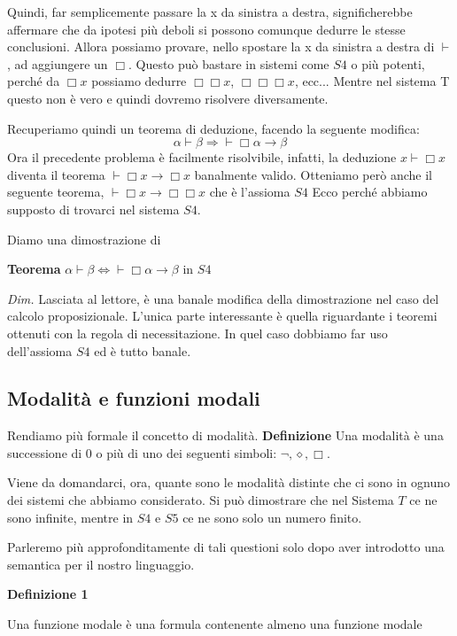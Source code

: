\documentclass[a4paper, 12pt]{article}
\begin{document}
Quindi, far semplicemente passare la x da sinistra a destra, significherebbe affermare che
da ipotesi più deboli si possono comunque dedurre le stesse conclusioni. Allora possiamo provare,
nello spostare la x da sinistra a destra di $\vdash$, ad aggiungere un $\Box$.
Questo può bastare in sistemi come $S4$ o più potenti, perché da $\Box x$ possiamo dedurre
$\Box \Box x$, $\Box \Box \Box x$, ecc...
Mentre nel sistema T questo non è vero e quindi dovremo risolvere diversamente.

Recuperiamo quindi un teorema di deduzione, facendo la seguente modifica:
$$\alpha \vdash \beta \Rightarrow \vdash \Box \alpha \rightarrow \beta$$
Ora il precedente problema è facilmente risolvibile, infatti, la deduzione $x \vdash \Box x$
diventa il teorema $\vdash \Box x \rightarrow \Box x$ banalmente valido.
Otteniamo però anche il seguente teorema, $\vdash \Box x \rightarrow \Box \Box x$ che è l'assioma $S4$
Ecco perché abbiamo supposto di trovarci nel sistema $S4$.

Diamo una dimostrazione di

\begin{flushleft}
\textbf{Teorema}
$\alpha \vdash \beta \Leftrightarrow \vdash \Box \alpha \rightarrow \beta$ in $S4$

\textit{Dim.}
Lasciata al lettore, è una banale modifica della dimostrazione nel caso del calcolo proposizionale.
L'unica parte interessante è quella riguardante i teoremi ottenuti con la regola di necessitazione.
In quel caso dobbiamo far uso dell'assioma $S4$ ed è tutto banale.
\end{flushleft}



\subsection{Modalità e funzioni modali}
Rendiamo più formale il concetto di modalità.
\textbf{Definizione}
Una modalità è una successione di 0 o più di uno dei seguenti simboli: $\neg,\diamond,\Box$.

Viene da domandarci, ora, quante sono le modalità distinte che ci sono in ognuno dei sistemi che abbiamo considerato.
Si può dimostrare che nel Sistema $T$ ce ne sono infinite,
mentre in $S4$ e $S5$ ce ne sono solo un numero finito.

Parleremo più approfonditamente di tali questioni solo dopo aver introdotto una semantica
per il nostro linguaggio.

\begin{flushleft}
\textbf{Definizione 1}

Una funzione modale è una formula contenente almeno una funzione modale
\end{flushleft}
\end{document}
